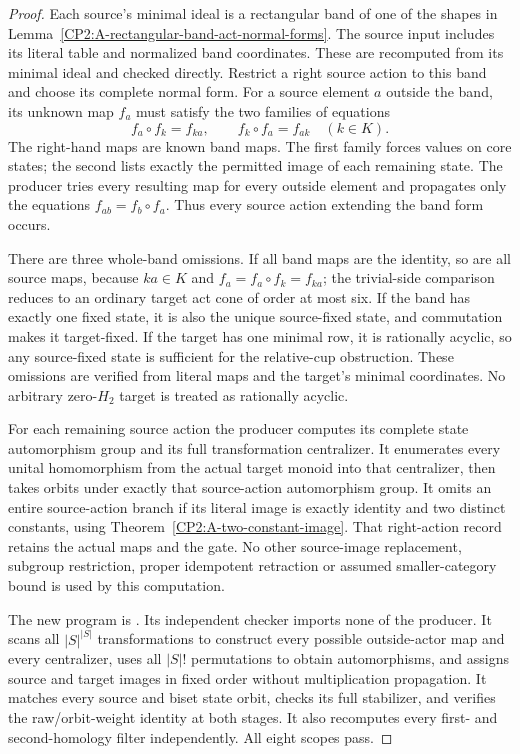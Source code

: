 \begin{proof}
Each source's minimal ideal is a rectangular band of one of
the shapes in Lemma~\ref{CP2:A-rectangular-band-act-normal-forms}.
The source input includes its literal table and normalized band
coordinates. These are recomputed from its minimal ideal and
checked directly. Restrict a right source action to this band
and choose its complete normal form. For a source element $a$
outside the band, its unknown map $f_a$ must satisfy the two
families of equations
\[
 f_a\circ f_k=f_{ka},\qquad f_k\circ f_a=f_{ak}
 \quad(k\in K).
\]
The right-hand maps are known band maps. The first family
forces values on core states; the second lists exactly the
permitted image of each remaining state. The producer tries
every resulting map for every outside element and propagates
only the equations $f_{ab}=f_b\circ f_a$. Thus every source
action extending the band form occurs.

There are three whole-band omissions. If all band maps are
the identity, so are all source maps, because $ka\in K$ and
$f_a=f_a\circ f_k=f_{ka}$; the trivial-side comparison reduces
to an ordinary target act cone of order at most six.
If the band has exactly one fixed state, it is also the unique
source-fixed state, and commutation makes it target-fixed.
If the target has one minimal row, it is rationally acyclic,
so any source-fixed state is sufficient for the relative-cup
obstruction. These omissions are verified from literal maps
and the target's minimal coordinates. No arbitrary zero-$H_2$
target is treated as rationally acyclic.

For each remaining source action the producer computes its
complete state automorphism group and its full transformation
centralizer. It enumerates every unital homomorphism from the
actual target monoid into that centralizer, then takes orbits
under exactly that source-action automorphism group.
It omits an entire source-action branch if its literal image
is exactly identity and two distinct constants, using
Theorem~\ref{CP2:A-two-constant-image}. That right-action
record retains the actual maps and the gate. No other
source-image replacement, subgroup restriction, proper
idempotent retraction or assumed smaller-category bound is
used by this computation.

The new program is .
Its independent checker
 imports none of
the producer. It scans all $|S|^{|S|}$ transformations to
construct every possible outside-actor map and every centralizer,
uses all $|S|!$ permutations to obtain automorphisms, and assigns
source and target images in fixed order without multiplication
propagation. It matches every source and biset state orbit,
checks its full stabilizer, and verifies the raw/orbit-weight
identity at both stages. It also recomputes every first- and
second-homology filter independently. All eight scopes pass.


\end{proof}
